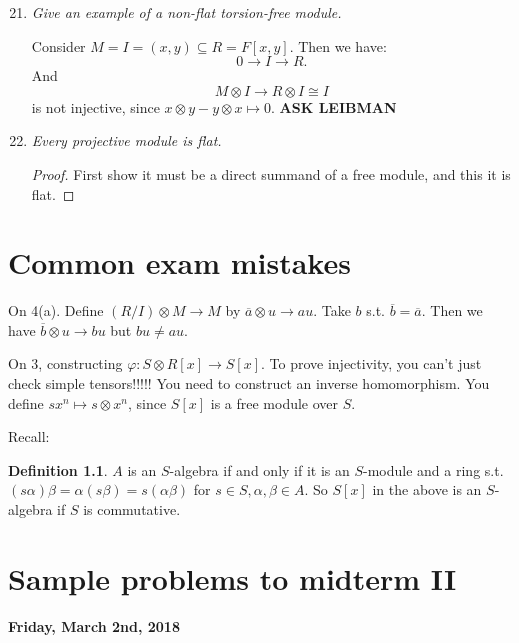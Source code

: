 \documentclass[9pt,reqno,twoside]{amsbook}
\theoremstyle{plain}
\numberwithin{section}{chapter}
\numberwithin{equation}{chapter}
\theoremstyle{definition}
\newtheorem{Def}[theorem]{Definition}
\theoremstyle{remark}
\theoremstyle{plain}
\newcommand{\sub}{\subseteq}
\newcommand{\tens}{\otimes}
\renewcommand{\bar}{\overline}%
\renewcommand{\phi}{\varphi}
\begin{document}
\begin{enumerate}[label=\arabic*.]
\setcounter{enumi}{20}
\item \textit{Give an example of a non-flat torsion-free module. }

Consider $M = I = (x,y) \sub R = F[x,y]$. Then we have:
$$
0 \to I \to R.
$$
And 
$$
M \tens I \to R \tens I \cong I
$$
 is not injective, since $x \tens y - y \tens x \mapsto 0$. \textbf{ASK LEIBMAN}
 



\setcounter{enumi}{21}
\item \textit{Every projective module is flat. }

\begin{proof}
First show it must be a direct summand of a free module, and this it is flat. 
\end{proof}




\end{enumerate}


\chapter{Common exam mistakes}

On 4(a). Define $(R/I) \tens M \to M$ by $\bar{a} \tens u \to au$. Take $b$ s.t. $\bar{b} = \bar{a}$. Then we have $\bar{b} \tens u \to bu$ but $bu \neq au$. 

On 3, constructing $\phi:S \tens R[x] \to S[x]$. To prove injectivity, you can't just check simple tensors!!!!! You need to construct an inverse homomorphism. You define $sx^n \mapsto s \tens x^n$, since $S[x]$ is a free module over $S$. 

Recall:
\begin{Def}
$A$ is an $S$-algebra if and only if it is an $S$-module and a ring s.t. $(s\alpha)\beta = \alpha(s\beta) = s(\alpha\beta)$ for $s \in S, \alpha,\beta \in A$. So $S[x]$ in the above is an $S$-algebra if $S$ is commutative. 
\end{Def}














\chapter{Sample problems to midterm II}

\textbf{Friday, March 2nd, 2018}
\end{document}
